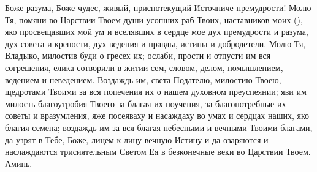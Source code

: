 \mychapterending

\begin{mymulticols}
 

Боже разума, Боже чудес, живый, приснотекущий Источниче премудрости! Молю Тя, помяни во Царствии Твоем души усопших раб Твоих, наставников моих (), яко просвещавших мой ум и вселявших в сердце мое дух премудрости и разума, дух совета и крепости, дух ведения и правды, истины и добродетели. Молю Тя, Владыко, милостив буди о гресех их; ослаби, прости и отпусти им вся согрешения, елика сотворили в житии сем, словом, делом, помышлением, ведением и неведением. Воздаждь им, света Подателю, милостию Твоею, щедротами Твоими за вся попечения их о нашем духовном преуспеянии; яви им милость благоутробия Твоего за благая их поучения, за благопотребные их советы и вразумления, яже посеяваху и насаждаху во умах и сердцах наших, яко благия семена; воздаждь им за вся благая небесными и вечными Твоими благами, да узрят в Тебе, Боже, лицем к лицу вечную Истину и да озаряются и наслаждаются трисиятельным Светом Ея в безконечные веки во Царствии Твоем. Аминь. 

\end{mymulticols}

\mychapterending

